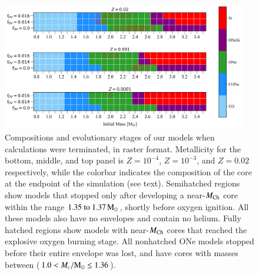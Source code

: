 \documentclass[main.tex]{subfiles}
\begin{document}
 \begin{figure}[h!]
    \centering
    \includegraphics[width=0.95\textwidth]{figures/chapter2/final_fates/parameterSpaceRaster.png}
    \caption{Compositions and evolutionary stages of our \seriesone models when calculations were terminated, in raster format. Metallicity for the bottom, middle, and top panel is $Z=10^{-4}$, $Z=10^{-3}$, and $Z=0.02$ respectively, while the colorbar indicates the composition of the core at the endpoint of the simulation (see text). Semihatched regions show models that stopped only after developing a near-$M_{\mathrm{Ch}}$ core within the range $\numrange{1.35}{1.37}\msun$, shortly before oxygen ignition. All these models also have no envelopes and contain no helium. Fully hatched regions show models with near-$M_{\mathrm{Ch}}$ cores that reached the explosive oxygen burning stage. All nonhatched ONe models stopped before their entire envelope was lost, and have cores with masses  between  ($1.0 < M_c/\rm M_\odot \leq 1.36$).}  
        \label{fig:parameterSpace}
\end{figure}
\end{document}
